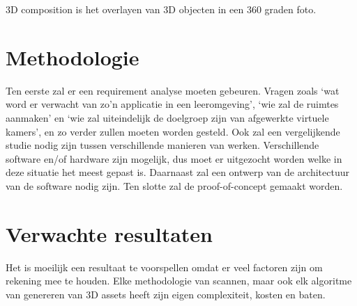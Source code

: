 \documentclass{hogent-article}
\begin{document}
3D composition is het overlayen van 3D objecten in een 360 graden foto.


\section{Methodologie}%
\label{sec:methodologie}


    Ten eerste zal er een requirement analyse moeten gebeuren. Vragen zoals ‘wat word er verwacht van zo’n applicatie in een leeromgeving’, ‘wie zal de ruimtes aanmaken’ en ‘wie zal uiteindelijk de doelgroep zijn van afgewerkte virtuele kamers’, en zo verder zullen moeten worden gesteld. Ook zal een vergelijkende studie nodig zijn tussen verschillende manieren van werken. Verschillende software en/of hardware zijn mogelijk, dus moet er uitgezocht worden welke in deze situatie het meest gepast is. Daarnaast zal een ontwerp van de architectuur van de software nodig zijn. Ten slotte zal de proof-of-concept gemaakt worden.

\section{Verwachte resultaten}%
\label{sec:verwachte-resultaten}


Het is moeilijk een resultaat te voorspellen omdat er veel factoren zijn om rekening mee te houden. Elke methodologie van scannen, maar ook elk algoritme van genereren van 3D assets heeft zijn eigen complexiteit, kosten en baten.








\printbibliography[heading=bibintoc]
\end{document}
